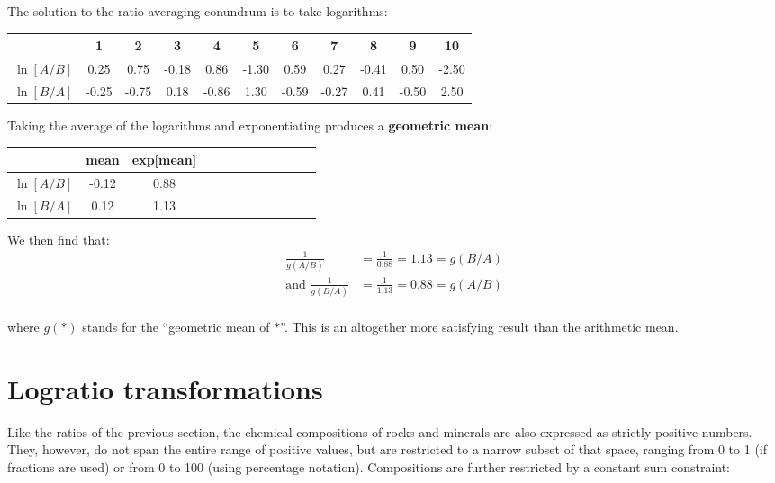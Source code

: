 The solution to the ratio averaging conundrum is to take logarithms:

\begin{center}
  \begin{tabular}{c|cccccccccc}
    & 1 & 2 & 3 & 4 & 5 & 6 & 7 & 8 & 9 & 10 \\ \hline
    $\ln[A/B]$ & 0.25 & 0.75 & -0.18 & 0.86 & -1.30 &
    0.59 & 0.27 & -0.41 & 0.50 & -2.50 \\
    $\ln[B/A]$ & -0.25 & -0.75 & 0.18 & -0.86 & 1.30 &
    -0.59 & -0.27 & 0.41 & -0.50 & 2.50 \\
  \end{tabular}
\end{center}

Taking the average of the logarithms and exponentiating produces a
\textbf{geometric mean}:

\begin{center}
  \begin{tabular}{c|cccccccccc|c}
    &  mean & exp[mean] \\ \hline
    $\ln[A/B]$ & -0.12 & 0.88 \\
    $\ln[B/A]$ & 0.12 & 1.13 \\
  \end{tabular}
\end{center}

We then find that:
\[
\begin{split}
  \frac{1}{g(A/B)} & = \frac{1}{0.88} = 1.13 = g(B/A) \\
  \mbox{and~}\frac{1}{g(B/A)} & = \frac{1}{1.13} = 0.88 = g(A/B) \\
\end{split}
\]

\noindent where $g(\ast)$ stands for the ``geometric mean of $\ast$''.
This is an altogether more satisfying result than the arithmetic mean.

\section{Logratio transformations}
\label{sec:logratios}

Like the ratios of the previous section, the chemical compositions of
rocks and minerals are also expressed as strictly positive
numbers. They, however, do not span the entire range of positive
values, but are restricted to a narrow subset of that space, ranging
from 0 to 1 (if fractions are used) or from 0 to 100 (using percentage
notation).  Compositions are further restricted by a constant sum
constraint:


